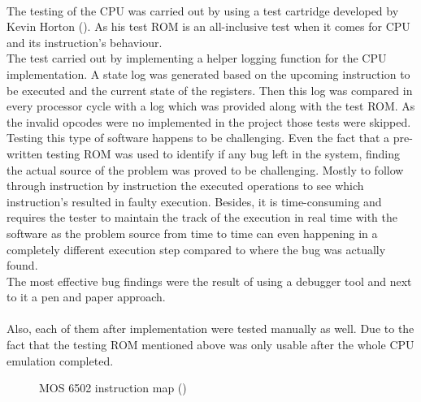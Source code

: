 \documentclass[]{report}
\begin{document}
\paragraph{ }
The testing of the CPU was carried out by using a test cartridge developed by Kevin Horton (\cite{NEST}). As his test ROM is an all-inclusive test when it comes for CPU and its instruction's behaviour.
\\
The test carried out by implementing a helper logging function for the CPU implementation. A state log was generated based on the upcoming instruction to be executed and the current state of the registers. Then this log was compared in every processor cycle with a log which was provided along with the test ROM. 
As the invalid opcodes were no implemented in the project those tests were skipped.
\\
Testing this type of software happens to be challenging. Even the fact that a pre-written testing ROM was used to identify if any bug left in the system, finding the actual source of the problem was proved to be challenging. Mostly to follow through instruction by instruction the executed operations to see which instruction's resulted in faulty execution. Besides, it is time-consuming and requires the tester to maintain the track of the execution in real time with the software as the problem source from time to time can even happening in a completely different execution step compared to where the bug was actually found.
\\
The most effective bug findings were the result of using a debugger tool and next to it a pen and paper approach.
\paragraph{ }
Also, each of them after implementation were tested manually as well. Due to the fact that the testing ROM mentioned above was only usable after the whole CPU emulation completed.

\begin{figure}[h]
	\caption{\label{fig:my-label} MOS 6502 instruction map (\cite{TALK})}
\end{figure}
\clearpage
\end{document}
